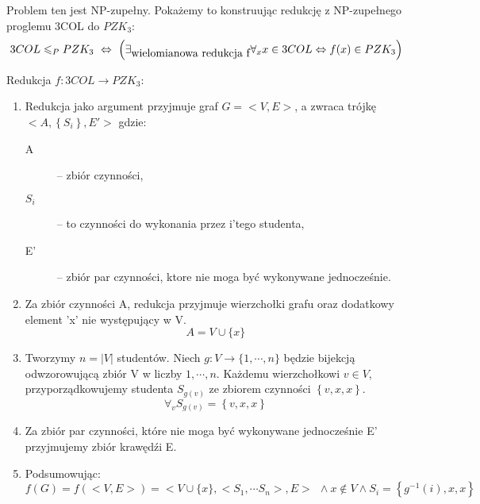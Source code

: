 \documentclass[svgnames]{report}
\begin{document}
Problem ten jest NP-zupełny.
Pokażemy to konstruując redukcję z NP-zupełnego proglemu 3COL do $PZK_3$:
\begin{equation*}
3COL \leqslant_P PZK_3 \ \Leftrightarrow \ \left( \exists_{\hbox{wielomianowa redukcja f}} \forall_x x \in 3COL \Leftrightarrow f(x) \in PZK_3 \right)
\end{equation*} 

Redukcja $f:3COL \rightarrow PZK_3$:
\begin{enumerate}
	\item
		Redukcja jako argument przyjmuje graf $G=<V,E>$, a zwraca trójkę $<A, \left\{S_i\right\}, E'>$ gdzie:
		\begin{description} 
			\item[A] -- zbiór czynności,
			\item[$S_i$] --  to czynności do wykonania przez i'tego studenta,
			\item[E'] -- zbiór par czynności, ktore nie moga być wykonywane jednocześnie.
		\end{description}
	\item
		Za zbiór czynności A, redukcja przyjmuje wierzchołki grafu oraz dodatkowy element 'x' nie występujący w V.
		\begin{equation*}
			A = V \cup \{x\}
		\end{equation*}
	\item
		Tworzymy $n = |V|$ studentów. Niech $g:V \rightarrow \{1,\cdots ,n\}$ będzie bijekcją odwzorowującą zbiór V w liczby $1,\cdots ,n$.
		Każdemu wierzchołkowi $v \in V$, przyporządkowujemy studenta $S_{g(v)}$ ze zbiorem czynności $\left\{v, x, x\right\}$.
		\begin{equation*}
			\forall_v S_{g(v)} = \left\{ v, x, x \right\}
		\end{equation*}
	\item
		Za zbiór par czynności, które nie moga być wykonywane jednocześnie E' przyjmujemy zbiór krawędźi E.
	\item
		Podsumowując:
		\begin{equation*}
			f(G) = f(<V,E>) = <V \cup \{x\}, <S_1, \cdots S_n>, E> \ \ \wedge x \not\in V \wedge S_i = \left\{g^{-1}(i), x, x\right\}
		\end{equation*}
\end{enumerate}
\end{document}

